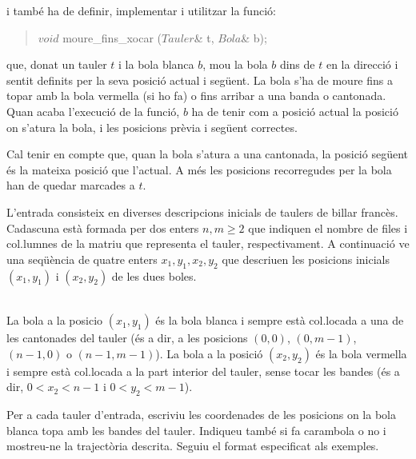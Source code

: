 i tamb\'{e} ha de definir, implementar i utilitzar la funci\'{o}:

\begin{quote}
 $void$ moure\_fins\_xocar ($Tauler$\& t, $Bola$\& b); 
\end{quote}

que, donat un tauler $t$ i la bola blanca $b$,  
mou la bola $b$ dins de $t$ en la direcció i sentit definits per la seva posició actual i següent. La bola s'ha de moure fins a topar amb la bola vermella (si ho fa) o fins arribar a una  banda o cantonada. Quan acaba l'execució de la funció, $b$  ha de tenir com a posició actual  la posició on s'atura la bola, i les posicions prèvia i següent  correctes. 
   
Cal tenir en compte que, quan la bola s'atura a una cantonada, la posició següent és la mateixa posició que l'actual.  A més les posicions recorregudes per la bola han de quedar marcades a $t$. 




\Input

L'entrada consisteix en diverses descripcions inicials de taulers de billar francès. Cadascuna està formada per dos enters $n, m \geq 2$ que indiquen el nombre de files i col.lumnes de la matriu que representa el tauler, respectivament. A continuació ve una seqüència de quatre enters $x_1, y_1, x_2, y_2$ que descriuen les posicions inicials $(x_1, y_1)$ i $(x_2, y_2)$ de les dues boles. 

\ \\
La bola a la posicio $(x_1, y_1)$ és la bola blanca i sempre està col.locada a una de les cantonades del tauler (és a dir, a les posicions $(0,0)$, 
$(0, m - 1)$, $(n - 1, 0)$ o $(n - 1, m - 1)$). La bola a la posició $(x_2,y_2)$ és la bola vermella i sempre està col.locada a la part interior del tauler, sense tocar les bandes (és a dir, $0<x_2<n-1$ i $0<y_2<m-1$).


\Output

Per a cada tauler d'entrada, escriviu les coordenades de les posicions on la bola blanca topa amb les bandes del tauler. Indiqueu també si fa carambola o no i mostreu-ne la trajectòria descrita. Seguiu el format especificat als exemples. 

\medskip



\Sample
